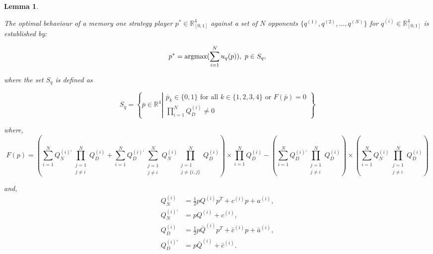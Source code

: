 \documentclass[10pt]{article}
\newcommand{\R}{\mathbb{R}}
\newtheorem{lemma}[theorem]{Lemma}
\begin{document}
\begin{lemma}\label{lemma:memone_group_best_response}

    The optimal behaviour of a memory one strategy player
    \(p^* \in \R_{[0, 1]} ^ 4\)
    against a set of \(N\) opponents \(\{q^{(1)}, q^{(2)}, \dots, q^{(N)} \}\)
    for \(q^{(i)} \in \R_{[0, 1]} ^ 4\) is established by:

    \[p^* = \textnormal{argmax}(\sum\limits_{i=1} ^ N  u_q(p)), \ p \in S_q,\]

    where the set \(S_q\) is defined as

    \[
        S_q =
        \left\{\bar{p} \in \mathbb{R} ^ 4 \left |
            \begin{array}{c}
                \bar{p}_k \in \{0, 1\} \text{ for all } k \in \{1, 2, 3, 4 \} \text{ or } F(\bar{p}) = 0\\
                \prod\limits_{i=1} ^ N Q_{D}^{(i)} \neq 0
            \end{array}
             \right.
        \right\}
    \]


    where,
    \begin{equation}\label{eq:group_derivative_numerator_condition}
    F(p)=(\sum\limits_{i=1} ^ {N} Q_{N}^{(i)'} \prod_{\substack{j=1 \\ j \neq i}} ^ N Q_{D}^{(i)}
     + \sum\limits_{i=1} ^ {N} Q_{D}^{(i)'} \sum_{\substack{j=1 \\ j \neq i}} ^ {N} Q_{N}^{(i)}
    \prod_{\substack{j=1 \\ j \neq \{i, j\}}} ^ N Q_{D}^{(i)}) \times
    \prod\limits_{i=1} ^ N Q_{D}^{(i)} - (\sum\limits_{i=1} ^ {N} Q_{D}^{(i)'}
    \prod_{\substack{j=1 \\ j \neq i}} ^ N Q_{D}^{(i)}) \times
    (\sum\limits_{i=1} ^ {N} Q_{N}^{(i)} \prod_{\substack{j=1 \\ j \neq i}} ^ N Q_{D}^{(i)})
    \end{equation}

    and,
    \begin{align*}
        Q_{N}^{(i) } & = \frac{1}{2} pQ^{(i)} p^T + c^{(i)} p + a^ {(i)}, \\
        Q_{N}^{(i)'} & =  pQ^{(i)} + c^{(i)}, \\
        Q_{D}^{(i) } & = \frac{1}{2} p\bar{Q}^{(i)} p^T + \bar{c}^{(i)} p + \bar{a}^ {(i)}, \\
        Q_{D}^{(i)'} & =  p\bar{Q}^{(i)} + \bar{c}^{(i)}. \\
    \end{align*}
\end{lemma}
\end{document}

